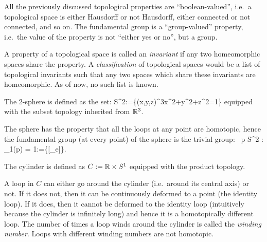 All the previously discussed topological properties are ``boolean-valued'', i.e.\ a topological space is either Hausdorff or not Hausdorff, either connected or not connected, and so on. The fundamental group is a ``group-valued'' property, i.e.\ the value of the property is not ``either yes or no'', but a group. 

A property of a topological space is called an \emph{invariant} if any two homeomorphic spaces share the property. A \emph{classification} of topological spaces would be a list of topological invariants such that any two spaces which share these invariants are homeomorphic. As of now, no such list is known. 

\be
The 2-sphere is defined as the set:
\bse
S^2:=\{(x,y,z)\in \R^3\mid x^2+y^2+z^2=1\}
\ese
equipped with the subset topology inherited from $\mathbb{R}^3$.

\begin{center}
\end{center}

The sphere has the property that all the loops at any point are homotopic, hence the fundamental group (at every point) of the sphere is the trivial group:
\bse
\forall \, p \in S^2 : \pi_1(p) = 1:=\{[\g_e]\}.
\ese
\ee

\be
The cylinder is defined as $C:=\mathbb{R}\times S^1$ equipped with the product topology.

\begin{center}
\end{center}

A loop in $C$ can either go around the cylinder (i.e.\ around its central axis) or not. If it does not, then it can be continuously deformed to a point (the identity loop). If it does, then it cannot be deformed to the identity loop (intuitively because the cylinder is infinitely long) and hence it is a homotopically different loop. The number of times a loop winds around the cylinder is called the \emph{winding number}. Loops with different winding numbers are not homotopic.

